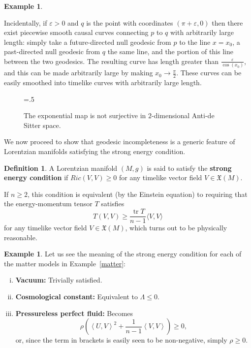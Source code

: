 \documentclass[10pt]{amsart}
\newcommand{\tr}{\operatorname{tr}}
\newcommand{\cX}{\mathfrak{X}}
\theoremstyle{definition}
\newtheorem{Def}[Thm]{Definition}
\newtheorem{Example}[Thm]{Example}
\theoremstyle{remark}
\begin{document}
\begin{Example}
\begin{enumerate}[(i)]
Incidentally, if $\varepsilon > 0$ and $q$ is the point with coordinates $(\pi + \varepsilon, 0)$ then there exist piecewise smooth causal curves connecting $p$ to $q$ with arbitrarily large length: simply take a future-directed null geodesic from $p$ to the line $x=x_0$, a past-directed null geodesic from $q$ the same line, and the portion of this line between the two geodesics. The resulting curve has length greater than $\frac{\varepsilon}{\cos(x_0)}$, and this can be made arbitrarily large by making $x_0 \to \frac\pi2$. These curves can be easily smoothed into timelike curves with arbitrarily large length.
\end{enumerate}
\end{Example}

\begin{figure}[h!]
\begin{center}
\epsfxsize=.5\textwidth
\leavevmode
{}
\end{center}
\caption{The exponential map is not surjective in $2$-dimensional Anti-de Sitter space.} \label{AdS}
\end{figure}

We now proceed to show that geodesic incompleteness is a generic feature of Lorentzian manifolds satisfying the strong energy condition.

\begin{Def}
A Lorentzian manifold $(M,g)$ is said to satisfy the {\bf strong energy condition} if $Ric(V,V) \geq 0$ for any timelike vector field $V \in \cX(M)$.
\end{Def}

If $n \geq 2$, this condition is equivalent (by the Einstein equation) to requiring that the energy-momentum tensor $T$ satisfies 
\[
T(V,V) \geq \frac{\tr T}{n-1} \langle V, V \rangle
\]
for any timelike vector field $V \in \cX(M)$, which turns out to be physically reasonable.

\begin{Example} Let us see the meaning of the strong energy condition for each of the matter models in Example~\ref{matter}:
\begin{enumerate}[(i)]
\item
{\bf Vacuum:} Trivially satisfied.
\item
{\bf Cosmological constant:} Equivalent to $\Lambda \leq 0$.
\item
{\bf Pressureless perfect fluid:} Becomes
\[
\rho \left( \left\langle U,V \right\rangle^2 + \frac1{n-1} \left\langle V,V \right\rangle \right) \geq 0,
\]
or, since the term in brackets is easily seen to be non-negative, simply $\rho \geq 0$.
\end{enumerate}
\end{Example}
\end{document}
